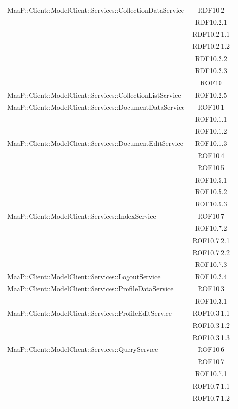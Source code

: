 \begin{center}
\begin{longtable}{|p{0.8\linewidth}|c|}
\midrule
MaaP::Client::ModelClient::Services::CollectionDataService
& RDF10.2\\
& RDF10.2.1\\
& RDF10.2.1.1\\
& RDF10.2.1.2\\
& RDF10.2.2\\
& RDF10.2.3\\
& ROF10\\

\midrule
MaaP::Client::ModelClient::Services::CollectionListService
& ROF10.2.5\\

\midrule
MaaP::Client::ModelClient::Services::DocumentDataService
& ROF10.1\\
& ROF10.1.1\\
& ROF10.1.2\\

\midrule
MaaP::Client::ModelClient::Services::DocumentEditService
& ROF10.1.3\\
& ROF10.4\\
& ROF10.5\\
& ROF10.5.1\\
& ROF10.5.2\\
& ROF10.5.3\\

\midrule
MaaP::Client::ModelClient::Services::IndexService
& ROF10.7\\
& ROF10.7.2\\
& ROF10.7.2.1\\
& ROF10.7.2.2\\
& ROF10.7.3\\

\midrule
MaaP::Client::ModelClient::Services::LogoutService
& ROF10.2.4\\

\midrule
MaaP::Client::ModelClient::Services::ProfileDataService
& ROF10.3\\
& ROF10.3.1\\

\midrule
MaaP::Client::ModelClient::Services::ProfileEditService
& ROF10.3.1.1\\
& ROF10.3.1.2\\
& ROF10.3.1.3\\

\midrule
MaaP::Client::ModelClient::Services::QueryService
& ROF10.6\\
& ROF10.7\\
& ROF10.7.1\\
& ROF10.7.1.1\\
& ROF10.7.1.2\\


\end{longtable}
\end{center}
